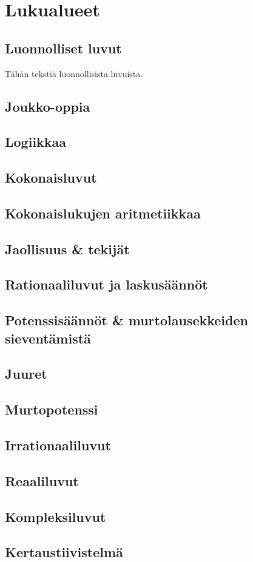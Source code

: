 


\part{Lukualueet}
\chapter{Luonnolliset luvut}

Tähän tekstiä luonnollisista luvuista.

\chapter{Joukko-oppia}
\chapter{Logiikkaa}
\chapter{Kokonaisluvut}
\chapter{Kokonaislukujen aritmetiikkaa}
\chapter{Jaollisuus \& tekijät}
\chapter{Rationaaliluvut ja laskusäännöt}
\chapter{Potenssisäännöt \& murtolausekkeiden sieventämistä}
\chapter{Juuret}
\chapter{Murtopotenssi}
\chapter{Irrationaaliluvut}
\chapter{Reaaliluvut}
\chapter{Kompleksiluvut}
\chapter{Kertaustiivistelmä}
